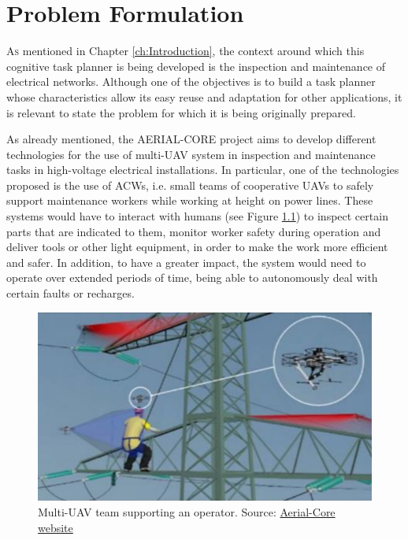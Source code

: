 \chapter{Problem Formulation}
\label{ch:ProblemFormulation}
\lettrine[lraise=-0.1, lines=2, loversize=0.2]{A}{s} mentioned in Chapter \ref{ch:Introduction}, the context around which this cognitive task planner is being developed is the inspection and maintenance of electrical networks. Although one of the objectives is to build a task planner whose characteristics allow its easy reuse and adaptation for other applications, it is relevant to state the problem for which it is being originally prepared. 

As already mentioned, the AERIAL-CORE project aims to develop different technologies for the use of multi-\gls{UAV} system in inspection and maintenance tasks in high-voltage electrical installations. In particular, one of the technologies proposed is the use of \glspl{ACW}, i.e. small teams of cooperative \glspl{UAV} to safely support maintenance workers while working at height on power lines. These systems would have to interact with humans (see Figure \ref{fig:aerial_co_worker}) to inspect certain parts that are indicated to them, monitor worker safety during operation and deliver tools or other light equipment, in order to make the work more efficient and safer. In addition, to have a greater impact, the system would need to operate over extended periods of time, being able to autonomously deal with certain faults or recharges.

\begin{figure}[htbp]
    \centering
    \includegraphics[width=.75\linewidth]
    {ProblemFormulation/figures/aerial_co_worker.jpeg}
    \caption{Multi-\gls{UAV} team supporting an operator. Source: \href{https://aerial-core.eu/}{Aerial-Core website}}
    \label{fig:aerial_co_worker}
\end{figure}

